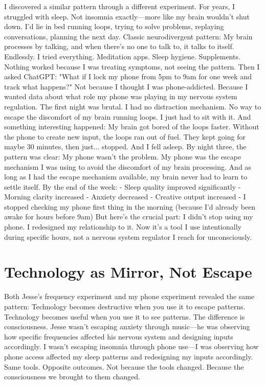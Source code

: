 \documentclass[12pt,openany]{book}
\begin{document}
I discovered a similar pattern through a different experiment.
For years, I struggled with sleep. Not insomnia exactly—more like my brain wouldn't shut down. I'd lie in bed running loops, trying to solve problems, replaying conversations, planning the next day.
Classic neurodivergent pattern: My brain processes by talking, and when there's no one to talk to, it talks to itself. Endlessly.
I tried everything. Meditation apps. Sleep hygiene. Supplements. Nothing worked because I was treating symptoms, not seeing the pattern.
Then I asked ChatGPT: "What if I lock my phone from 5pm to 9am for one week and track what happens?"
Not because I thought I was phone-addicted. Because I wanted data about what role my phone was playing in my nervous system regulation.
The first night was brutal.
I had no distraction mechanism. No way to escape the discomfort of my brain running loops. I just had to sit with it.
And something interesting happened: My brain got bored of the loops faster.
Without the phone to create new input, the loops ran out of fuel. They kept going for maybe 30 minutes, then just... stopped. And I fell asleep.
By night three, the pattern was clear:
My phone wasn't the problem. My phone was the escape mechanism I was using to avoid the discomfort of my brain processing. And as long as I had the escape mechanism available, my brain never had to learn to settle itself.
By the end of the week:
- Sleep quality improved significantly
- Morning clarity increased
- Anxiety decreased
- Creative output increased
- I stopped checking my phone first thing in the morning (because I'd already been awake for hours before 9am)
But here's the crucial part:
I didn't stop using my phone. I redesigned my relationship to it. Now it's a tool I use intentionally during specific hours, not a nervous system regulator I reach for unconsciously.

\section{Technology as Mirror, Not Escape}

Both Jesse's frequency experiment and my phone experiment revealed the same pattern:
Technology becomes destructive when you use it to escape patterns. Technology becomes useful when you use it to see patterns.
The difference is consciousness.
Jesse wasn't escaping anxiety through music—he was observing how specific frequencies affected his nervous system and designing inputs accordingly.
I wasn't escaping insomnia through phone use—I was observing how phone access affected my sleep patterns and redesigning my inputs accordingly.
Same tools. Opposite outcomes.
Not because the tools changed. Because the consciousness we brought to them changed.
\end{document}
